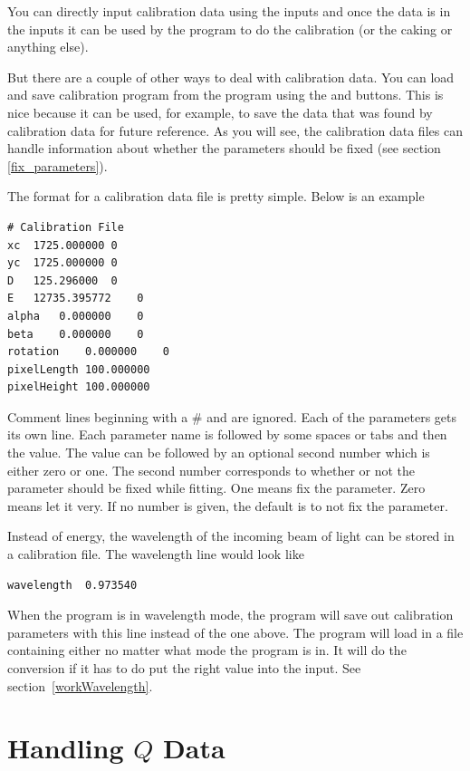 You can directly input calibration data using 
the inputs and once the data is in the inputs
it can be used by the program to do the calibration
(or the caking or anything else).

But there are a couple of other ways to deal
with calibration data.
You can load and save calibration program
from the program using the 
and  buttons. This is nice
because it can be used, for example, to save 
the data that was found by calibration data
for future reference. As you will see, the 
calibration data files can handle information
about whether the parameters should be fixed
(see section \ref{fix_parameters}).

The format for a calibration data file is 
pretty simple. Below is  an example
\begin{lstlisting}[caption={Calibration Parameters}]
# Calibration File
xc	1725.000000	0
yc	1725.000000	0
D	125.296000	0
E	12735.395772	0
alpha	0.000000	0
beta	0.000000	0
rotation	0.000000	0
pixelLength	100.000000
pixelHeight	100.000000
\end{lstlisting}
Comment lines beginning with
a \# and are ignored. Each of the parameters
gets its own line. Each parameter name is 
followed by some spaces or tabs and then the
value. The value can be followed by an optional
second number which is either zero or one.
The second number corresponds to whether or
not the parameter should be fixed while
fitting. One means fix the parameter. Zero means
let it very. If no number is given, the default
is to not fix the parameter.

Instead of energy, the wavelength of the incoming
beam of light can be stored in a calibration file.
The wavelength line would look like 
\begin{lstlisting}[caption={Wavelength Parameter}]
wavelength	0.973540
\end{lstlisting}
When the program is in wavelength mode, the program
will save out calibration parameters with this line
instead of the one above. The program will load in a 
file containing either no matter what mode the program 
is in. It will do the conversion if it has to do put 
the right value into the input. See 
section~\ref{workWavelength}.


\section{\texorpdfstring{Handling $Q$ Data}{Handling Q Data}}
\label{TheQValues}

